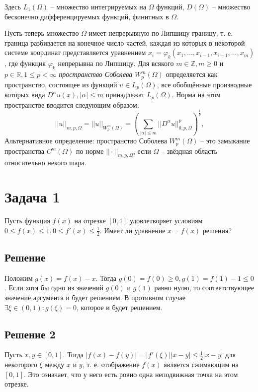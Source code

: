 \documentclass[11pt]{article}
\newcounter{th}\setcounter{th}{0}
\begin{document}
Здесь \(L_1(\Omega)\) -- множество интегрируемых на \(\Omega\) функций, \(D(\Omega)\) -- множество бесконечно дифференцируемых функций, финитных в \(\Omega\).

Пусть теперь множество \(\Omega\) имеет непрерывную по Липшицу границу, т. е. граница разбивается на конечное число частей, каждая из которых в некоторой системе координат представляется уравнением \(x_i = \varphi_k(x_1, \ldots, x_{i - 1}, x_{i + 1}, \ldots, x_m)\), где функция \(\varphi_k\) непрерывна по Липшицу. Для всякого \(m \in \mathbb{Z}, m \geq 0\) и \(p \in \mathbb{R}, 1 \leq p < \infty\) \emph{пространство Соболева} \(W^m_p(\Omega)\) определяется как пространство, состоящее из функций \(u \in L_p(\Omega)\), все обобщённые производные которых вида \(D^{\alpha}u(x), |\alpha| \leq m\) принадлежат \(L_p(\Omega)\). Норма на этом пространстве вводится следующим образом:
\begin{equation*}
||u||_{m, p, \Omega} = ||u||_{W_p^m(\Omega)} = \left(\sum_{|\alpha| \leq m}||D^{\alpha}u||^p_{0, p, \Omega}\right)^{\frac1p},
\end{equation*}
Альтернативное определение: пространство Соболева \(W_p^m(\Omega)\) -- это замыкание пространства \(C^m(\Omega)\) по норме \(||\cdot||_{m, p, \Omega}\), если \(\Omega\) -- звёздная область относительно некого шара.
\section{Задача 1}
\label{sec:org2a87fd3}
Пусть функция \(f(x)\) на отрезке \([0, 1]\) удовлетворяет условиям \(0 \leq f(x) \leq 1, 0 \leq f'(x) \leq \frac12\). Имеет ли уравнение \(x = f(x)\) решения?
\subsection{Решение}
\label{sec:org9c709e1}
Положим \(g(x) = f(x) - x\). Тогда \(g(0) = f(0) \geq 0, g(1) = f(1) - 1 \leq 0\). Если хотя бы одно из значений \(g(0)\) и \(g(1)\) равно нулю, то соответствующее значение аргумента и будет решением. В противном случае \(\exists \xi \in (0, 1): g(\xi) = 0\), которое и будет решением.
\subsection{Решение 2}
\label{sec:org3eb5ef5}
Пусть \(x, y \in [0, 1]\). Тогда \(|f(x) - f(y)| = |f'(\xi)||x - y| \leq \frac12|x - y|\) для некоторого \(\xi\) между \(x\) и \(y\), т. е. отображение \(f(x)\) является сжимающим на \([0, 1]\). Это означает, что у него есть ровно одна неподвижная точка на этом отрезке.
\end{document}
